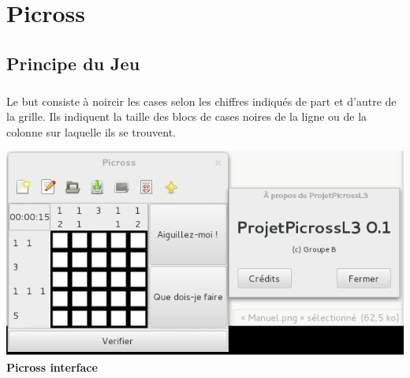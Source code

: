 
\newcommand{\titre}{{\Huge Manuel d'utilisation}\\de Picross} 
\newcommand{\titrehead}{Manuel d'utilisation}
    

%


\maketitle
\tableofcontents




\chapter{Picross}
\section{Principe du Jeu}
        \paragraph*{}
       Le but consiste à noircir les cases selon les chiffres indiqués de part et d'autre de la grille. Ils indiquent la taille des blocs de cases noires de la ligne ou de la colonne sur laquelle ils se trouvent.\\ 

       \begin{center}
                      \includegraphics[scale=0.6]{data/screenMaquette/APropos.png}\\
                      \textbf{Picross interface}
      \end{center}

